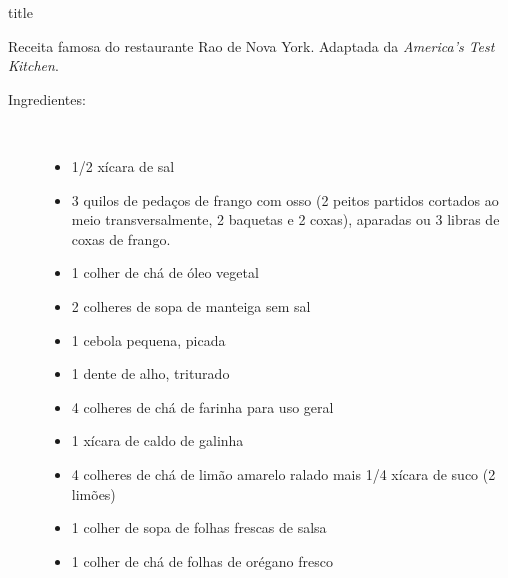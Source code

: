 \documentclass [11pt, letterpaper] {article}
\begin{document}
 {title}


Receita famosa do restaurante Rao de Nova York. Adaptada da {\it America's Test Kitchen}.

\begin {description}

\item [Ingredientes:] \ \\
\begin {itemize}
\item 1/2 xícara de sal
\item 3 quilos de pedaços de frango com osso (2 peitos partidos cortados ao meio transversalmente, 2 baquetas e 2 coxas), aparadas ou 3 libras de coxas de frango.
\item 1 colher de chá de óleo vegetal
\item 2 colheres de sopa de manteiga sem sal
\item 1 cebola pequena, picada
\item 1 dente de alho, triturado
\item 4 colheres de chá de farinha para uso geral
\item 1 xícara de caldo de galinha
\item 4 colheres de chá de limão amarelo ralado mais 1/4 xícara de suco (2 limões)
\item 1 colher de sopa de folhas frescas de salsa
\item 1 colher de chá de folhas de orégano fresco
\end {itemize}


\end{description}
\end{document}
